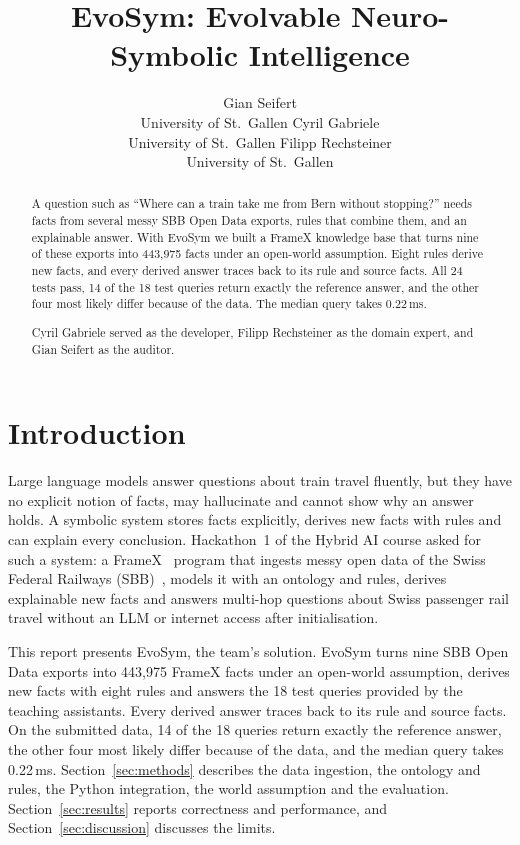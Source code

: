 \documentclass[10pt]{article}
\title{EvoSym: Evolvable Neuro-Symbolic Intelligence}
\author{\name Gian Seifert \\
      \addr University of St.\ Gallen
      \AND
      \name Cyril Gabriele \\
      \addr University of St.\ Gallen
      \AND
      \name Filipp Rechsteiner \\
      \addr University of St.\ Gallen}
\begin{document}
\maketitle

\begin{abstract}
A question such as ``Where can a train take me from Bern without stopping?'' needs facts from several messy SBB Open Data exports, rules that combine them, and an explainable answer. With EvoSym we built a FrameX knowledge base that turns nine of these exports into 443,975 facts under an open-world assumption. Eight rules derive new facts, and every derived answer traces back to its rule and source facts. All 24 tests pass, 14 of the 18 test queries return exactly the reference answer, and the other four most likely differ because of the data. The median query takes 0.22\,ms.

Cyril Gabriele served as the developer, Filipp Rechsteiner as the domain expert, and Gian Seifert as the auditor.
\end{abstract}

\section{Introduction}
\label{sec:introduction}

Large language models answer questions about train travel fluently, but they have no explicit notion of facts, may hallucinate and cannot show why an answer holds. A symbolic system stores facts explicitly, derives new facts with rules and can explain every conclusion. Hackathon~1 of the Hybrid AI course asked for such a system: a FrameX~\citep{framex} program that ingests messy open data of the Swiss Federal Railways (SBB)~\citep{sbbdata}, models it with an ontology and rules, derives explainable new facts and answers multi-hop questions about Swiss passenger rail travel without an LLM or internet access after initialisation.

This report presents EvoSym, the team's solution. EvoSym turns nine SBB Open Data exports into 443,975 FrameX facts under an open-world assumption, derives new facts with eight rules and answers the 18 test queries provided by the teaching assistants. Every derived answer traces back to its rule and source facts. On the submitted data, 14 of the 18 queries return exactly the reference answer, the other four most likely differ because of the data, and the median query takes 0.22\,ms. Section~\ref{sec:methods} describes the data ingestion, the ontology and rules, the Python integration, the world assumption and the evaluation. Section~\ref{sec:results} reports correctness and performance, and Section~\ref{sec:discussion} discusses the limits.
\end{document}
